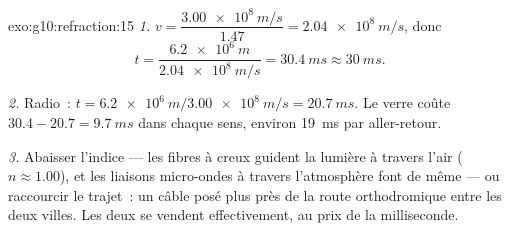 \begin{solution}{exo:g10:refraction:15}
\emph{1.} $v = \dfrac{\qty{3.00e8}{m/s}}{1.47} = \qty{2.04e8}{m/s}$,
donc
\[
t = \frac{\qty{6.2e6}{m}}{\qty{2.04e8}{m/s}} = \qty{30.4}{ms} \approx
\qty{30}{ms}.
\]

\emph{2.} Radio~: $t = \qty{6.2e6}{m}/\qty{3.00e8}{m/s} =
\qty{20.7}{ms}$. Le verre coûte $30.4 - 20.7 = \qty{9.7}{ms}$ dans
chaque sens, environ \qty{19}{ms} par aller-retour.

\emph{3.} Abaisser l'indice --- les fibres à  creux guident la
lumière à travers l'air ($n \approx 1.00$), et les liaisons micro-ondes
à travers l'atmosphère font de même --- ou raccourcir le trajet~: un
câble posé plus près de la route orthodromique entre les deux villes.
Les deux se vendent effectivement, au prix de la milliseconde.
\end{solution}

